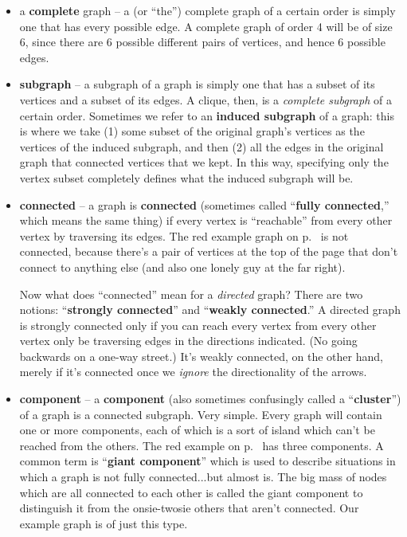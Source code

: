 \begin{itemize}
\item a \textbf{complete} graph -- a (or ``the'') complete graph of a certain
order is simply one that has every possible edge. A complete graph of order 4
will be of size 6, since there are 6 possible different pairs of vertices, and
hence 6 possible edges.


\item \textbf{subgraph} -- a subgraph of a graph is simply one that has a
subset of its vertices and a subset of its edges. A clique, then, is a
\textit{complete subgraph} of a certain order. Sometimes we refer to an
\textbf{induced subgraph} of a graph: this is where we take (1) some subset of
the original graph's vertices as the vertices of the induced subgraph, and then
(2) all the edges in the original graph that connected vertices that we kept.
In this way, specifying only the vertex subset completely defines what the
induced subgraph will be.


\item \textbf{connected} -- a graph is \textbf{connected} (sometimes called
``\textbf{fully connected},'' which means the same thing) if every vertex is
``reachable'' from every other vertex by traversing its edges. The red example
graph on p.~\pageref{first_example} is not connected, because there's a pair of
vertices at the top of the page that don't connect to anything else (and also
one lonely guy at the far right).


Now what does ``connected'' mean for a \textit{directed} graph? There are two
notions: ``\textbf{strongly connected}'' and ``\textbf{weakly connected}.'' A
directed graph is strongly connected only if you can reach every vertex from
every other vertex only be traversing edges in the directions indicated. (No
going backwards on a one-way street.) It's weakly connected, on the other hand,
merely if it's connected once we \textit{ignore} the directionality of the
arrows.


\item \textbf{component} -- a \textbf{component} (also sometimes confusingly
called a ``\textbf{cluster}'') of a graph is a connected subgraph. Very simple.
Every graph will contain one or more components, each of which is a sort of
island which can't be reached from the others. The red example on
p.~\pageref{first_example} has three components. A common term is
``\textbf{giant component}'' which is used to describe situations in which a
graph is not fully connected...but almost is. The big mass of nodes which are
all connected to each other is called the giant component to distinguish it
from the onsie-twosie others that aren't connected. Our example graph is of
just this type.


\end{itemize}
